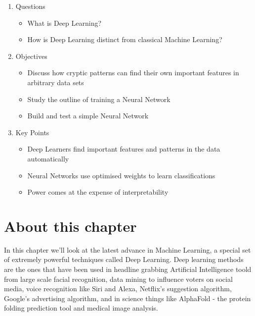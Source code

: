 \documentclass[
]{book}
\providecommand{\tightlist}{%
  \setlength{\itemsep}{0pt}\setlength{\parskip}{0pt}}
\begin{document}
\begin{enumerate}
\def\labelenumi{\arabic{enumi}.}
\tightlist
\item
  Questions

  \begin{itemize}
  \tightlist
  \item
    What is Deep Learning?
  \item
    How is Deep Learning distinct from classical Machine Learning?
  \end{itemize}
\item
  Objectives

  \begin{itemize}
  \tightlist
  \item
    Discuss how cryptic patterns can find their own important features in arbitrary data sets
  \item
    Study the outline of training a Neural Network
  \item
    Build and test a simple Neural Network
  \end{itemize}
\item
  Key Points

  \begin{itemize}
  \tightlist
  \item
    Deep Learners find important features and patterns in the data automatically
  \item
    Neural Networks use optimised weights to learn classifications
  \item
    Power comes at the expense of interpretability
  \end{itemize}
\end{enumerate}

\hypertarget{about-this-chapter-3}{%
\section{About this chapter}\label{about-this-chapter-3}}

In this chapter we'll look at the latest advance in Machine Learning, a special set of extremely powerful techniques called Deep Learning. Deep learning methods are the ones that have been used in headline grabbing Artificial Intelligence toold from large scale facial recognition, data mining to influence voters on social media, voice recognition like Siri and Alexa, Netflix's suggestion algorithm, Google's advertising algorithm, and in science things like AlphaFold - the protein folding prediction tool and medical image analysis.
\end{document}
